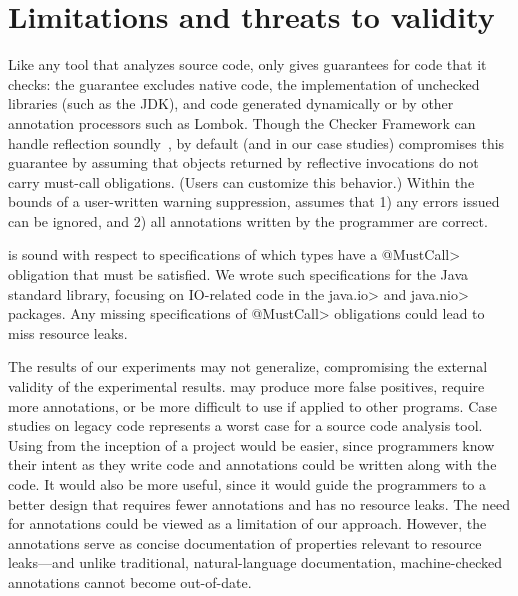 \section{Limitations and threats to validity}
\label{sec:threats}

Like any tool that analyzes source code, \tool only
gives guarantees for code that it checks: the guarantee
excludes native code, the implementation of unchecked libraries (such as the JDK),
and code generated dynamically or by other annotation processors
such as Lombok.
Though
the Checker Framework can handle 
reflection soundly~\cite{BarrosJMVDdAE2015}, by default (and in our case studies)
\tool compromises this guarantee
by assuming that objects returned by reflective invocations
do not carry must-call obligations.  (Users can customize this behavior.)
Within the bounds
of a user-written warning suppression, \tool assumes that 1)
any errors issued can be ignored, and 2) all annotations
written by the programmer are correct.

\Tool is sound with respect to specifications of which types have a
\<@MustCall> obligation that must be satisfied.  We wrote such specifications
for the Java standard library, focusing on IO-related code in the \<java.io> and
\<java.nio> packages.  Any missing specifications of \<@MustCall> obligations
could lead \tool to miss resource leaks.

The results of our experiments may not generalize, compromising the
external validity of the experimental results.
\Tool may produce more false positives, require
more annotations, or be more difficult to use if applied to other
programs.
Case studies on legacy code represents a worst case for a source code
analysis tool.  Using \tool from
the inception of a project would be easier, since programmers know their
intent as they write code and annotations could be written along with the
code.  It would also be more useful, since it would guide the programmers
to a better design that requires fewer annotations and has no resource leaks.
The need for annotations could be viewed as a limitation of our approach.
However, the annotations serve as concise documentation of
properties relevant to resource leaks---and unlike traditional, natural-language
documentation, machine-checked annotations cannot become out-of-date.

